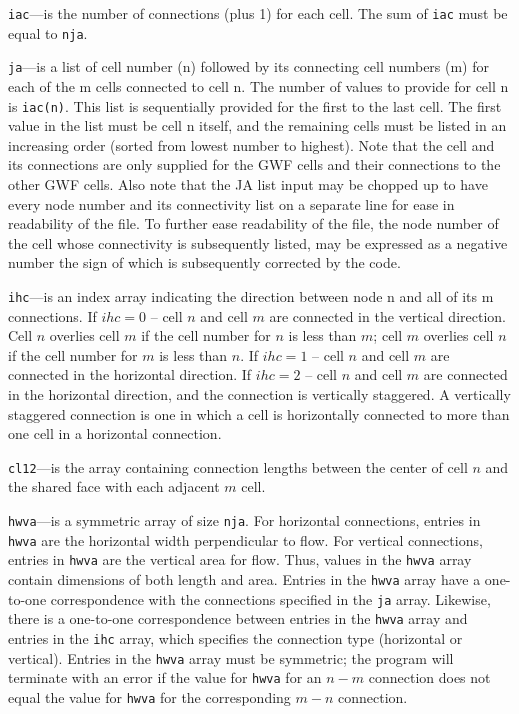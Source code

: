\begin{description}
\item \texttt{iac}---is the number of connections (plus 1) for each cell.  The sum of \texttt{iac} must be equal to \texttt{nja}.

\item \texttt{ja}---is a list of cell number (n) followed by its connecting cell numbers (m) for each of the m cells connected to cell n. The number of values to provide for cell n is \texttt{iac(n)}.  This list is sequentially provided for the first to the last cell. The first value in the list must be cell n itself, and the remaining cells must be listed in an increasing order (sorted from lowest number to highest).  Note that the cell and its connections are only supplied for the GWF cells and their connections to the other GWF cells.  Also note that the JA list input may be chopped up to have every node number and its connectivity list on a separate line for ease in readability of the file. To further ease readability of the file, the node number of the cell whose connectivity is subsequently listed, may be expressed as a negative number the sign of which is subsequently corrected by the code.

\item \texttt{ihc}---is an index array indicating the direction between node n and all of its m connections.  If $ihc=0$ -- cell $n$ and cell $m$ are connected in the vertical direction.  Cell $n$ overlies cell $m$ if the cell number for $n$ is less than $m$; cell $m$ overlies cell $n$ if the cell number for $m$ is less than $n$.  If $ihc=1$ -- cell $n$ and cell $m$ are connected in the horizontal direction.  If $ihc=2$ -- cell $n$ and cell $m$ are connected in the horizontal direction, and the connection is vertically staggered.  A vertically staggered connection is one in which a cell is horizontally connected to more than one cell in a horizontal connection.

\item \texttt{cl12}---is the array containing connection lengths between the center of cell $n$ and the shared face with each adjacent $m$ cell.

\item \texttt{hwva}---is a symmetric array of size \texttt{nja}.  For horizontal connections, entries in \texttt{hwva} are the horizontal width perpendicular to flow.  For vertical connections, entries in \texttt{hwva} are the vertical area for flow.  Thus, values in the \texttt{hwva} array contain dimensions of both length and area.  Entries in the \texttt{hwva} array have a one-to-one correspondence with the connections specified in the \texttt{ja} array.  Likewise, there is a one-to-one correspondence between entries in the \texttt{hwva} array and entries in the \texttt{ihc} array, which specifies the connection type (horizontal or vertical).  Entries in the \texttt{hwva} array must be symmetric; the program will terminate with an error if the value for \texttt{hwva} for an $n-m$ connection does not equal the value for \texttt{hwva} for the corresponding $m-n$ connection.


\end{description}
